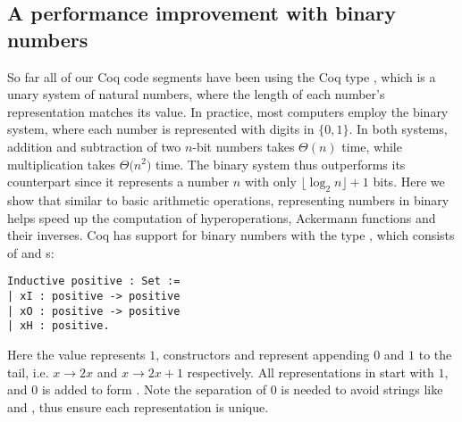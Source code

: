 \subsection{A performance improvement with binary numbers}
So far all of our Coq code segments have been using the Coq type , which is a unary system of natural numbers, where the length of each number's representation matches its value. In practice, most computers employ the binary system, where each number is represented with digits in $\{0, 1\}$. In both systems, addition and subtraction of two $n$-bit numbers takes $\Theta(n)$ time, while multiplication takes $\Theta \big(n^2\big)$ time. The binary system thus outperforms its counterpart since it represents a number $n$ with only $\lfloor \log_2n \rfloor + 1$ bits. Here we show that similar to basic arithmetic operations, representing numbers in binary helps speed up the computation of hyperoperations, Ackermann functions and their inverses. Coq has support for binary numbers with the type , which consists of  and s:
\begin{lstlisting}
Inductive positive : Set :=
| xI : positive -> positive
| xO : positive -> positive
| xH : positive.
\end{lstlisting}
Here the value  represents $1$, constructors  and  represent appending $0$ and $1$ to the tail, i.e. $x\to 2x$ and $x\to 2x+1$ respectively. All representations in  start with $1$, and $0$ is added to form . Note the separation of $0$ is needed to avoid strings like  and , thus ensure each representation is unique.

